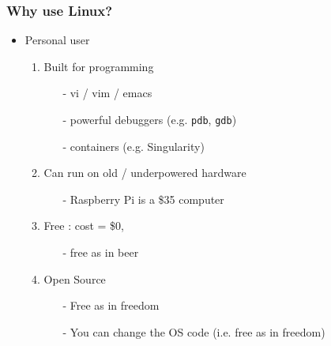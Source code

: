 \documentclass{beamer}
\newcommand{\code}[1]{\colorbox{codegray}{\texttt{#1}}}
\begin{document}
\begin{frame}
\frametitle{Why use Linux?}
\begin{itemize}
    \item Personal user
    \pause
    \begin{enumerate}
        \item Built for programming
        \begin{itemize}
            \pause
            \item[-] vi / vim / emacs
            \pause
            \item[-] powerful debuggers (e.g. \code{pdb}, \code{gdb})
            \pause
            \item[-] containers (e.g. Singularity)
        \end{itemize}
        \pause
        \item Can run on old / underpowered hardware
        \begin{itemize}
            \item[-] Raspberry Pi is a \$35 computer
        \end{itemize}
        \pause
        \item Free : cost = \$0, 
        \begin{itemize}
            \item[-] free as in beer
        \end{itemize}
        \pause
        \item Open Source 
        \begin{itemize}
            \item[-] Free as in freedom 
            \pause
            \item[-] You can change the OS code (i.e. free as in freedom)
        \end{itemize}
    \end{enumerate}
\end{itemize}
\end{frame}
\end{document}
